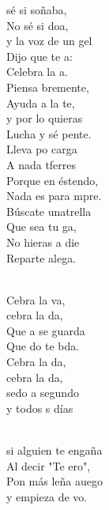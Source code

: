 \documentclass[12pt]{article}
\begin{document}
\begin{multicols*}{2}
\begin{cancion}%
	 sé si soñaba,\\
	No sé si doa, \\
	y la voz de un gel\\
	Dijo que te a:\\
	Celebra la a.   \\
	Piensa bremente,\\
	Ayuda a la te,\\
	y por lo  quieras\\
	Lucha y sé pente.\\
	Lleva po carga\\
	A nada tferres\\
	Porque en éstendo,\\
	Nada es para mpre.\\
	Búscate unatrella\\
	Que sea tu ga, \\
	No hieras a die\\
	Reparte alega.\\\jump\\
	\begin{chorus}%
	Cebra la va, \\
	cebra la da,\\
	Que a se guarda\\
	Que do te bda.\\
	Cebra la da, \\
	cebra la da,\\
	sedo a segundo\\
	y todos s días\\
	\end{chorus}%
	\jump\\
	si alguien te engaña\\
	Al decir "Te ero",\\
	Pon más leña auego\\
	y empieza de vo.\\

\end{cancion}
\end{multicols*}
\end{document}
